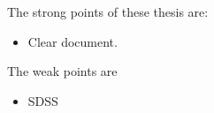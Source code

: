 \documentclass{article}
\begin{document}
The strong points of these thesis are:
\begin{itemize}
    \item Clear document.
\end{itemize}

The weak points are 
\begin{itemize}
    \item SDSS
\end{itemize}
\end{document}
